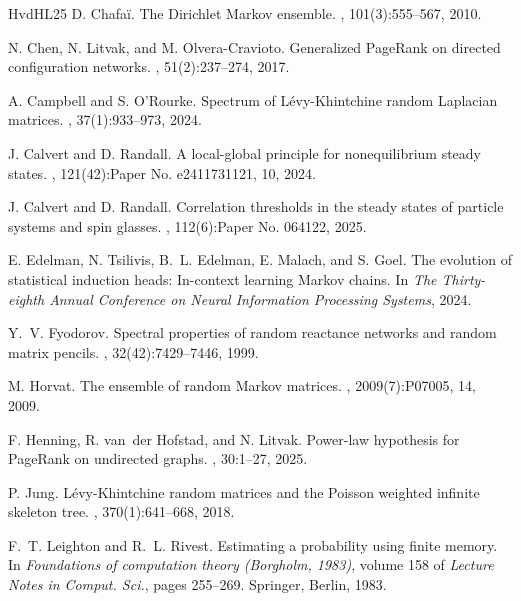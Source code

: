\documentclass[12pt]{amsart}
\DeclareMathOperator{\1}{\mathbf{1}}
\begin{document}
\begin{thebibliography}{HvdHL25}
D. Chafa\"i.
\newblock The {D}irichlet {M}arkov ensemble.
, 101(3):555--567, 2010.

N. Chen, N. Litvak, and M. Olvera-Cravioto.
\newblock Generalized {P}age{R}ank on directed configuration networks.
, 51(2):237--274, 2017.

A. Campbell and S. O'Rourke.
\newblock Spectrum of {L}\'evy-{K}hintchine random {L}aplacian matrices.
, 37(1):933--973, 2024.

J. Calvert and D. Randall.
\newblock A local-global principle for nonequilibrium steady states.
, 121(42):Paper No. e2411731121, 10, 2024.

J. Calvert and D. Randall.
\newblock Correlation thresholds in the steady states of particle systems and spin glasses.
, 112(6):Paper No. 064122, 2025.

E. Edelman, N. Tsilivis, B.~L. Edelman, E. Malach, and S. Goel.
\newblock The evolution of statistical induction heads: In-context learning {M}arkov chains.
\newblock In {\em The Thirty-eighth Annual Conference on Neural Information Processing Systems}, 2024.

Y.~V. Fyodorov.
\newblock Spectral properties of random reactance networks and random matrix pencils.
, 32(42):7429--7446, 1999.

M. Horvat.
\newblock The ensemble of random {M}arkov matrices.
, 2009(7):P07005, 14, 2009.

F. Henning, R. van~der Hofstad, and N. Litvak.
\newblock Power-law hypothesis for {P}age{R}ank on undirected graphs.
, 30:1--27, 2025.

P. Jung.
\newblock L\'evy-{K}hintchine random matrices and the {P}oisson weighted infinite skeleton tree.
, 370(1):641--668, 2018.

F.~T. Leighton and R.~L. Rivest.
\newblock Estimating a probability using finite memory.
\newblock In {\em Foundations of computation theory ({B}orgholm, 1983)}, volume 158 of {\em Lecture Notes in Comput. Sci.}, pages 255--269. Springer, Berlin, 1983.


\end{thebibliography}
\end{document}
